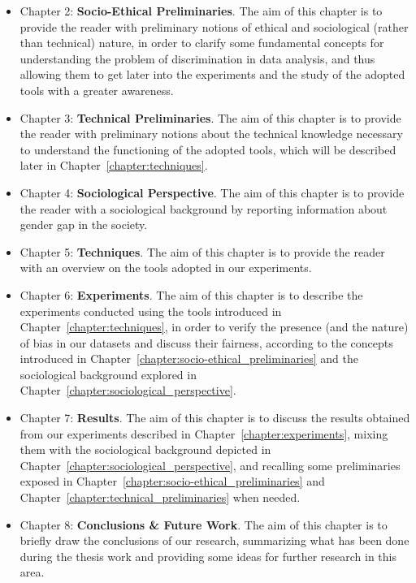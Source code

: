 \begin{itemize}
\item Chapter 2: \textbf{Socio-Ethical Preliminaries}. The aim of this chapter is to provide the reader with preliminary notions of ethical and sociological (rather than technical) nature, in order to clarify some fundamental concepts for understanding the problem of discrimination in data analysis, and thus allowing them to get later into the experiments and the study of the adopted tools with a greater awareness.
\item Chapter 3: \textbf{Technical Preliminaries}. The aim of this chapter is to provide the reader with preliminary notions about the technical knowledge necessary to understand the functioning of the adopted tools, which will be described later in Chapter~\ref{chapter:techniques}.
\item Chapter 4: \textbf{Sociological Perspective}. The aim of this chapter is to provide the reader with a sociological background by reporting information about gender gap in the society.
\item Chapter 5: \textbf{Techniques}. The aim of this chapter is to provide the reader with an overview on the tools adopted in our experiments.
\item Chapter 6: \textbf{Experiments}. The aim of this chapter is to describe the experiments conducted using the tools introduced in Chapter~\ref{chapter:techniques}, in order to verify the presence (and the nature) of bias in our datasets and discuss their fairness, according to the concepts introduced in Chapter~\ref{chapter:socio-ethical_preliminaries} and the sociological background explored in Chapter~\ref{chapter:sociological_perspective}.
\item Chapter 7: \textbf{Results}. The aim of this chapter is to discuss the results obtained from our experiments described in Chapter~\ref{chapter:experiments}, mixing them with the sociological background depicted in Chapter~\ref{chapter:sociological_perspective}, and recalling some preliminaries exposed in Chapter~\ref{chapter:socio-ethical_preliminaries} and Chapter~\ref{chapter:technical_preliminaries} when needed.
\item Chapter 8: \textbf{Conclusions \& Future Work}. The aim of this chapter is to briefly draw the conclusions of our research, summarizing what has been done during the thesis work and providing some ideas for further research in this area.
\end{itemize}
